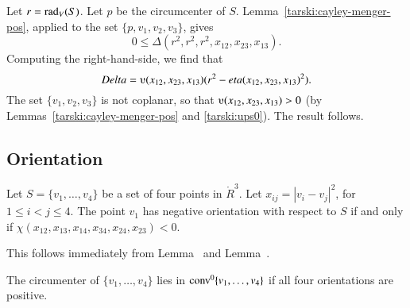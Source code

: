 \begin{tarskidata}
\begin{tarski}
\begin{proved}  Let $r=\operatorname{rad}_V(S)$.  Let $p$ be the circumcenter of $S$.
Lemma~\ref{tarski:cayley-menger-pos}, applied to the set $\{p,v_1,v_2,v_3\}$, gives
  $$
  0\le \Delta(r^2,r^2,r^2,x_{12},x_{23},x_{13}).
  $$
Computing the right-hand-side, we find that
$$
\Delta = \ups(x_{12},x_{23},x_{13}) (r^2 - \eta(x_{12},x_{23},x_{13})^2).
$$
The set $\{v_1,v_2,v_3\}$ is not coplanar, so that $\ups(x_{12},x_{23},x_{13})>0$
(by Lemmas~\ref{tarski:cayley-menger-pos} and \ref{tarski:ups0}).
The result follows.
\swallowed\end{proved}
\end{tarski}








\begin{tarski}
\section{Orientation}


\begin{lemma} 
Let $S=\{v_1,\ldots,v_4\}$ be a set of four points
in $\ring{R}^3$.  
Let $x_{ij}=|v_i-v_j|^2$, for $1\le i< j\le 4$.
The point $v_1$ has negative
orientation with respect to $S$ if and only if
    $\chi(x_{12},x_{13},x_{14},x_{34},x_{24},
    x_{23})<0$.
\end{lemma}

\begin{proved} 
This follows immediately from  Lemma~ and 
Lemma~.
\swallowed\end{proved}
\end{tarski}



\begin{tarski}

\begin{lemma}
The circumenter of $\{v_1,\ldots,v_4\}$ lies in
${\operatorname{conv}}^0\{v_1,\ldots,v_4\}$ if all four
orientations are positive.
\end{lemma}


\end{tarski}
\end{tarskidata}
